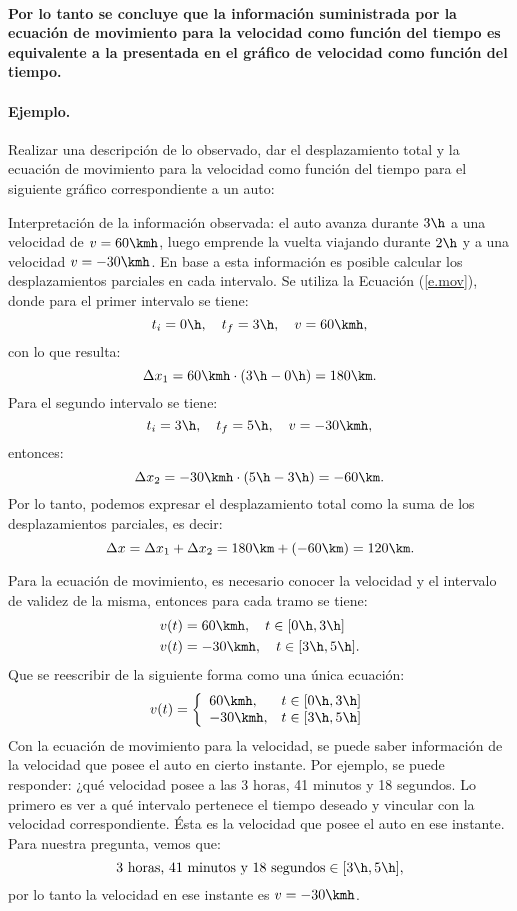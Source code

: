 \paragraph{ Por lo tanto se concluye que la información suministrada por la ecuación de
movimiento para la velocidad como función del tiempo es equivalente a la
presentada en el gráfico de velocidad como función del tiempo.}


\paragraph{Ejemplo.} 
Realizar una descripción de lo observado, dar el desplazamiento total y la
ecuación de movimiento para la velocidad como función del tiempo para el
siguiente gráfico correspondiente a un auto:


Interpretación de la información observada: el auto avanza durante $3\h$ a una
velocidad de $v=60\kmh$, luego emprende la vuelta viajando durante $2\h$ y a una
velocidad $v=-30\kmh$. En base a esta información es posible calcular los
desplazamientos parciales en cada intervalo. Se utiliza la Ecuación
(\ref{e.mov}), donde para el primer intervalo se tiene:
$$
t_i=0\h, \quad t_f=3\h, \quad v=60\kmh,
$$
con lo que resulta:
$$
\Delta x_1 = 60\kmh \cdot (3\h-0\h) =  180\km.
$$
Para el segundo intervalo se tiene:
$$
t_i=3\h, \quad t_f=5\h, \quad v=-30\kmh,
$$
entonces:
$$
\Delta x_2 = -30\kmh \cdot (5\h-3\h) =  -60\km.
$$
Por lo tanto, podemos expresar el desplazamiento total como la suma de los
desplazamientos parciales, es decir:
$$
\Delta x = \Delta x_1 + \Delta x_2 = 180\km + (-60\km) = 120\km.
$$

Para la ecuación de movimiento, es necesario conocer la velocidad y el intervalo
de validez de la misma, entonces para cada tramo se tiene:
\begin{align*}
  v(t) &= 60\kmh, \quad t \in [0\h,3\h] \\
  v(t) &= -30\kmh, \quad t \in [3\h,5\h].\\
\end{align*}
Que se reescribir de la siguiente forma como una única ecuación:
\[
v(t) = \left\{ 
\begin{array}{ll}
  60\kmh, & t \in [0\h,3\h] \\
  -30\kmh, & t \in [3\h,5\h] \\
\end{array}
\right.
\]
Con la ecuación de movimiento para la velocidad, se puede saber información de
la velocidad que posee el auto en cierto instante. Por ejemplo, se puede
responder: ¿qué velocidad posee a las 3 horas, 41 minutos y 18 segundos. Lo
primero es ver a qué intervalo pertenece el tiempo deseado y vincular con la
velocidad correspondiente. Ésta es la velocidad que posee el auto en ese
instante. Para nuestra pregunta, vemos que: 
$$
3 \text{ horas, } 41 \text{ minutos y } 18 \text{ segundos} \in [3\h,5\h],
$$
por lo tanto la velocidad en ese instante es $v=-30\kmh$.

